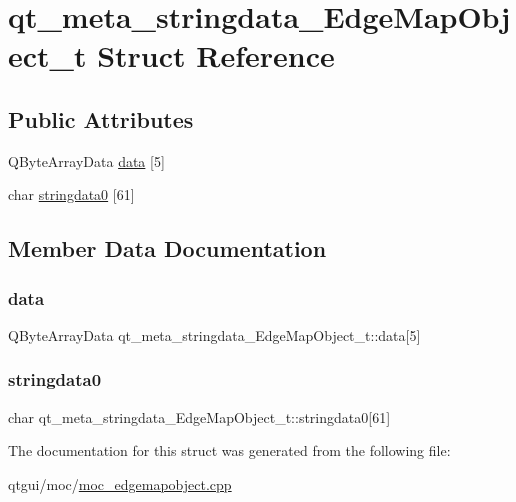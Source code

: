 \hypertarget{structqt__meta__stringdata___edge_map_object__t}{}\section{qt\+\_\+meta\+\_\+stringdata\+\_\+\+Edge\+Map\+Object\+\_\+t Struct Reference}
\label{structqt__meta__stringdata___edge_map_object__t}
\subsection*{Public Attributes}
\begin{DoxyCompactItemize}
\item 
Q\+Byte\+Array\+Data \mbox{\hyperlink{structqt__meta__stringdata___edge_map_object__t_a065179d74fead0f0ce105fd343910314}{data}} \mbox{[}5\mbox{]}
\item 
char \mbox{\hyperlink{structqt__meta__stringdata___edge_map_object__t_acde21dbd715288b496d0ce211c722526}{stringdata0}} \mbox{[}61\mbox{]}
\end{DoxyCompactItemize}


\subsection{Member Data Documentation}
\mbox{\label{structqt__meta__stringdata___edge_map_object__t_a065179d74fead0f0ce105fd343910314}} 
\subsubsection{\texorpdfstring{data}{data}}
{\footnotesize\ttfamily Q\+Byte\+Array\+Data qt\+\_\+meta\+\_\+stringdata\+\_\+\+Edge\+Map\+Object\+\_\+t\+::data\mbox{[}5\mbox{]}}

\mbox{\label{structqt__meta__stringdata___edge_map_object__t_acde21dbd715288b496d0ce211c722526}} 
\subsubsection{\texorpdfstring{stringdata0}{stringdata0}}
{\footnotesize\ttfamily char qt\+\_\+meta\+\_\+stringdata\+\_\+\+Edge\+Map\+Object\+\_\+t\+::stringdata0\mbox{[}61\mbox{]}}



The documentation for this struct was generated from the following file\+:\begin{DoxyCompactItemize}
\item 
qtgui/moc/\mbox{\hyperlink{moc__edgemapobject_8cpp}{moc\+\_\+edgemapobject.\+cpp}}\end{DoxyCompactItemize}

